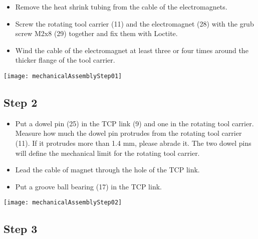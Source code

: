 \begin{minipage}[t]{0.6\textwidth}
	\begin{itemize}
		\item Remove the heat shrink tubing from the cable of the electromagnets.
		\item Screw the rotating tool carrier (11) and the electromagnet (28) with the grub screw M2x8 (29) together and fix them with Loctite. 
		\item Wind the cable of the electromagnet at least three or four times around the thicker flange of the tool carrier.
	\end{itemize}
\end{minipage}
\hfill
\begin{minipage}[t]{0.35\textwidth}
	\vspace{-\ht\strutbox}\texttt{[image: mechanicalAssemblyStep01]}
	\label{fig:MechanicalAssebmlyStep01}
\end{minipage}

\subsection*{Step 2}

\begin{minipage}[t]{0.6\textwidth}
	\begin{itemize}
		\item Put a dowel pin (25) in the TCP link (9) and one in the rotating tool carrier. Measure how much the dowel pin protrudes from the rotating tool carrier (11). If it protrudes more than 1.4 mm, please abrade it. The two dowel pins will define the mechanical limit for the rotating tool carrier.
		\item Lead the cable of magnet through the hole of the TCP link.
		\item Put a groove ball bearing (17) in the TCP link.
	\end{itemize}
\end{minipage}
\hfill
\begin{minipage}[t]{0.35\textwidth}
	\vspace{-\ht\strutbox}\texttt{[image: mechanicalAssemblyStep02]}
	\label{fig:MechanicalAssebmlyStep02} 
\end{minipage}

\subsection*{Step 3}

